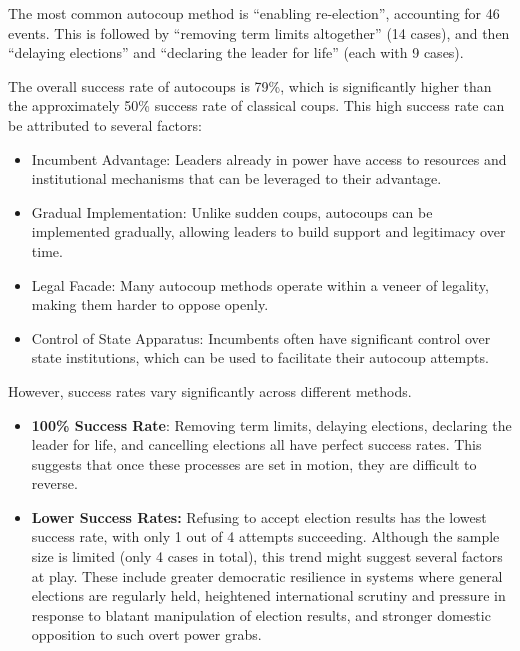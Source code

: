 \documentclass[
  12pt,
]{report}
\begin{document}
\begin{longtable}[]
\end{longtable}

The most common autocoup method is ``enabling re-election'', accounting
for 46 events. This is followed by ``removing term limits altogether''
(14 cases), and then ``delaying elections'' and ``declaring the leader
for life'' (each with 9 cases).

The overall success rate of autocoups is 79\%, which is significantly
higher than the approximately 50\% success rate of classical coups. This
high success rate can be attributed to several factors:

\begin{itemize}
\item
  Incumbent Advantage: Leaders already in power have access to resources
  and institutional mechanisms that can be leveraged to their advantage.
\item
  Gradual Implementation: Unlike sudden coups, autocoups can be
  implemented gradually, allowing leaders to build support and
  legitimacy over time.
\item
  Legal Facade: Many autocoup methods operate within a veneer of
  legality, making them harder to oppose openly.
\item
  Control of State Apparatus: Incumbents often have significant control
  over state institutions, which can be used to facilitate their
  autocoup attempts.
\end{itemize}

However, success rates vary significantly across different methods.

\begin{itemize}
\item
  \textbf{100\% Success Rate}: Removing term limits, delaying elections,
  declaring the leader for life, and cancelling elections all have
  perfect success rates. This suggests that once these processes are set
  in motion, they are difficult to reverse.
\item
  \textbf{Lower Success Rates:} Refusing to accept election results has
  the lowest success rate, with only 1 out of 4 attempts succeeding.
  Although the sample size is limited (only 4 cases in total), this
  trend might suggest several factors at play. These include greater
  democratic resilience in systems where general elections are regularly
  held, heightened international scrutiny and pressure in response to
  blatant manipulation of election results, and stronger domestic
  opposition to such overt power grabs.
\end{itemize}
\end{document}

